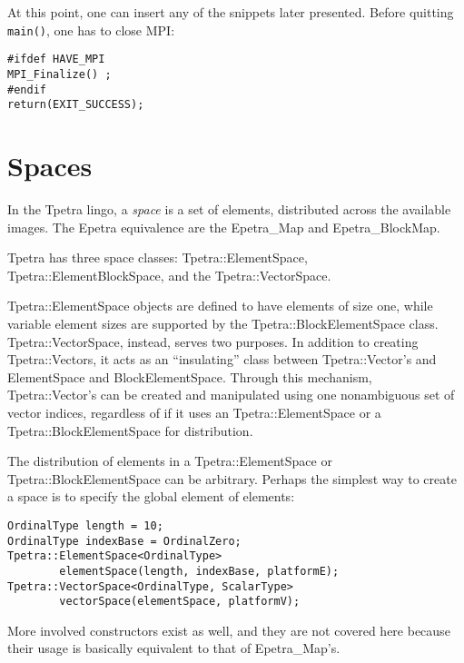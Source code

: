 At this point, one can insert any of the snippets later presented. Before
quitting \verb!main()!, one has to close MPI:
\begin{verbatim}
#ifdef HAVE_MPI
MPI_Finalize() ;
#endif
return(EXIT_SUCCESS);
\end{verbatim}

\section{Spaces}
\label{sec:tpetra_spaces}

In the Tpetra lingo, a {\sl space} is a set of elements, distributed across
the available images. The Epetra equivalence are the Epetra\_Map and
Epetra\_BlockMap. 

Tpetra has three space classes: Tpetra::ElementSpace, Tpetra::ElementBlockSpace,
  and the Tpetra::VectorSpace.

Tpetra::ElementSpace objects are defined to have elements of size one, while
variable element sizes are supported by the Tpetra::BlockElementSpace class.
Tpetra::VectorSpace, instead, serves two purposes. In addition to creating
Tpetra::Vectors, it acts as an ``insulating'' class between Tpetra::Vector's
and ElementSpace and BlockElementSpace. Through this mechanism,
  Tpetra::Vector's can be created and manipulated using one nonambiguous set
  of vector indices, regardless of if it uses an Tpetra::ElementSpace or a
  Tpetra::BlockElementSpace for distribution. 

\smallskip

The distribution of elements in a Tpetra::ElementSpace or
Tpetra::BlockElementSpace can be arbitrary. Perhaps 
the simplest way to create a space is to specify the global element of
elements:
\begin{verbatim}
OrdinalType length = 10;
OrdinalType indexBase = OrdinalZero;
Tpetra::ElementSpace<OrdinalType> 
        elementSpace(length, indexBase, platformE);
Tpetra::VectorSpace<OrdinalType, ScalarType> 
        vectorSpace(elementSpace, platformV);
\end{verbatim}
More involved constructors exist as well, and they are not covered here
because their usage is basically equivalent to that of Epetra\_Map's.

